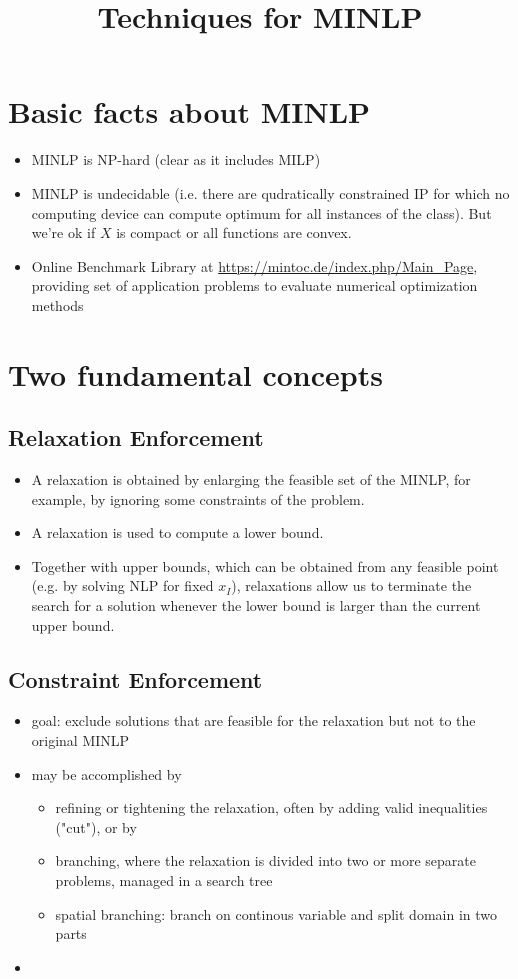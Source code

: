 \documentclass{article}
\title{\textbf{Techniques for MINLP}}
\begin{document}
\maketitle

\section{Basic facts about MINLP}
\begin{itemize}
\item MINLP is NP-hard (clear as it includes MILP)
\item MINLP is undecidable (i.e. there are qudratically constrained IP for which no computing device can compute optimum for all instances of the class). But we're ok if $X$ is compact or all functions are convex.
\item Online Benchmark Library at \url{https://mintoc.de/index.php/Main_Page}, providing set of application problems to evaluate numerical optimization methods
\end{itemize}

\section{Two fundamental concepts}
\subsection{Relaxation Enforcement}
\begin{itemize}
\item A relaxation is obtained by enlarging the feasible set of the MINLP, for example, by ignoring some constraints of the problem.
\item A relaxation is used to compute a lower bound. 
\item Together with upper bounds, which can be obtained from any feasible point (e.g. by solving NLP for fixed $x_I$), relaxations allow us to terminate the search for a solution whenever the lower bound is larger than the current upper bound.
\end{itemize}

\subsection{Constraint Enforcement}
\begin{itemize}
\item goal: exclude solutions that are feasible for the relaxation but not to the original MINLP
\item may be accomplished by 
\begin{itemize}
\item refining or tightening the relaxation, often by adding valid inequalities ("cut"), or by 
\item branching, where the relaxation is divided into two or more separate problems, managed in a search tree
\item spatial branching: branch on continous variable and split domain in two parts
\end{itemize}
\item 
\end{itemize} 
 
\end{document}
